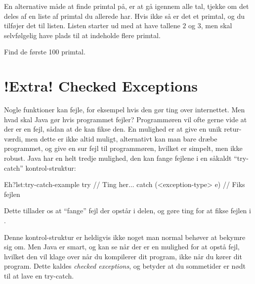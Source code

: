     \begin{exercise}
        En alternative måde at finde primtal på, er at gå igennem alle
        tal, tjekke om det deles af en liste af primtal du allerede
        har. Hvis ikke så er det et primtal, og du tilføjer det til
        listen. Listen starter ud med at have tallene \(2\) og \(3\),
        men skal selvfølgelig have plads til at indeholde flere
        primtal.

        Find de første 100 primtal.
    \end{exercise}

\section{!Extra! Checked Exceptions}

	Nogle funktioner kan fejle, for eksempel hvis den gør ting over internettet.
	Men hvad skal Java gør hvis programmet fejler? Programmøren vil ofte gerne
	vide at der er en fejl, sådan at de kan fikse den. En mulighed er at give en
	unik retur-værdi, men dette er ikke altid muligt, alternativt kan man bare
	dræbe programmet, og give en sur fejl til programmøren, hvilket er simpelt,
	men ikke robust. Java har en helt tredje mulighed, den kan fange fejlene i
	en såkaldt ``try-catch'' kontrol-struktur:

	\begin{JavaCode}{Eh?}{lst:try-catch-example}
		try {
			// Ting her...
		} catch (<exception-type> e) {
			// Fiks fejlen
		}
	\end{JavaCode}

	Dette tillader os at ``fange'' fejl der opstår i 
	delen, og gøre ting for at fikse fejlen i .

	Denne kontrol-struktur er heldigvis ikke noget man normal behøver at bekymre
	sig om. Men Java er smart, og kan se når der er en mulighed for at opstå
	fejl, hvilket den vil klage over når du kompilerer dit program, ikke når du
	kører dit program. Dette kaldes \emph{checked exceptions}, og betyder at du
	sommetider er nødt til at lave en try-catch.



